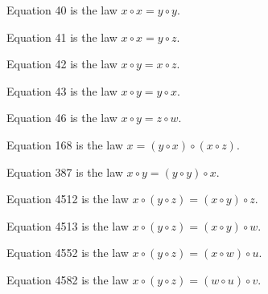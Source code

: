\begin{definition}[Equation 40]\label{eq40}\leanok{}  Equation 40 is the law $x \circ x = y \circ y$.
\end{definition}

\begin{definition}[Equation 41]\label{eq41}\leanok{}  Equation 41 is the law $x \circ x = y \circ z$.
\end{definition}

\begin{definition}[Equation 42]\label{eq42}\leanok{}  Equation 42 is the law $x \circ y = x \circ z$.
\end{definition}

\begin{definition}[Equation 43]\label{eq43}\leanok{}  Equation 43 is the law $x \circ y = y \circ x$.
\end{definition}

\begin{definition}[Equation 46]\label{eq46}\leanok{}  Equation 46 is the law $x \circ y = z \circ w$.
\end{definition}

\begin{definition}[Equation 168]\label{eq168}\leanok{}  Equation 168 is the law $x = (y \circ x) \circ (x \circ z)$.
\end{definition}

\begin{definition}[Equation 387]\label{eq387}\leanok{}  Equation 387 is the law $x \circ y = (y \circ y) \circ x$.
\end{definition}

\begin{definition}[Equation 4512]\label{eq4512}\leanok{}  Equation 4512 is the law $x \circ (y \circ z) = (x \circ y) \circ z$.
\end{definition}

\begin{definition}[Equation 4513]\label{eq4513}\leanok{}  Equation 4513 is the law $x \circ (y \circ z) = (x \circ y) \circ w$.
\end{definition}

\begin{definition}[Equation 4552]\label{eq4552}\leanok{}  Equation 4552 is the law $x \circ (y \circ z) = (x \circ w) \circ u$.
\end{definition}

\begin{definition}[Equation 4582]\label{eq4582}\leanok{}  Equation 4582 is the law $x \circ (y \circ z) = (w \circ u) \circ v$.
\end{definition}
